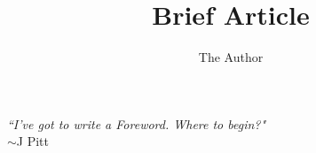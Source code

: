 \documentclass[fleqn]{article} %
\title{Brief Article}
\author{The Author}
\begin{document}

\setcounter{page}{2}

\newpage{}
\thispagestyle{empty}

\vspace*{100pt}
\begin{flushright}
	\textit{``I've got to write a Foreword. Where to begin?"}
    \\$\sim$J Pitt 
\end{flushright}

\newpage{}


\tableofcontents
















\end{document}
